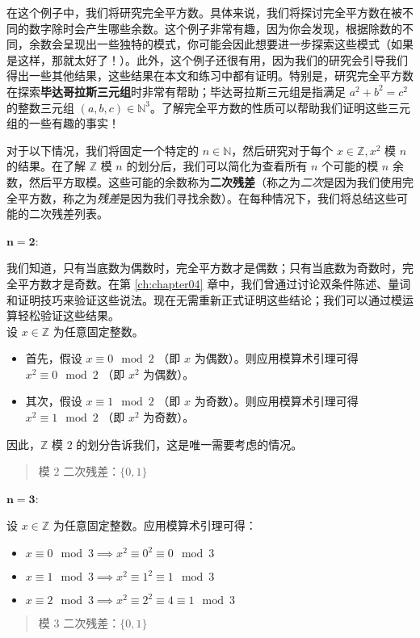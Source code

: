 \begin{example}[二次残差]\label{ex:example6.5.15}

    在这个例子中，我们将研究完全平方数。具体来说，我们将探讨完全平方数在被不同的数字除时会产生哪些余数。这个例子非常有趣，因为你会发现，根据除数的不同，余数会呈现出一些独特的模式，你可能会因此想要进一步探索这些模式（如果是这样，那就太好了！）。此外，这个例子还很有用，因为我们的研究会引导我们得出一些其他结果，这些结果在本文和练习中都有证明。特别是，研究完全平方数在探索\textbf{毕达哥拉斯三元组}时非常有帮助；毕达哥拉斯三元组是指满足 $a^2 + b^2 = c^2$ 的整数三元组 $(a, b, c) \in \mathbb{N}^3$。了解完全平方数的性质可以帮助我们证明这些三元组的一些有趣的事实！

    对于以下情况，我们将固定一个特定的 $n \in \mathbb{N}$，然后研究对于每个 $x \in \mathbb{Z}, x^2$ 模 $n$ 的结果。在了解 $\mathbb{Z}$ 模 $n$ 的划分后，我们可以简化为查看所有 $n$ 个可能的模 $n$ 余数，然后平方取模。这些可能的余数称为\textbf{二次残差}（称之为\emph{二次}是因为我们使用完全平方数，称之为\emph{残差}是因为我们寻找余数）。在每种情况下，我们将总结这些可能的二次残差列表。

    $\mathbf{n=2}$:

    我们知道，只有当底数为偶数时，完全平方数才是偶数；只有当底数为奇数时，完全平方数才是奇数。在第 \ref{ch:chapter04} 章中，我们曾通过讨论双条件陈述、量词和证明技巧来验证这些说法。现在无需重新正式证明这些结论；我们可以通过模运算轻松验证这些结果。\\
    设 $x \in \mathbb{Z}$ 为任意固定整数。
    \begin{itemize}
        \item 首先，假设 $x \equiv 0 \mod 2$ （即 $x$ 为偶数）。则应用模算术引理可得 $x^2 \equiv 0 \mod 2$ （即 $x^2$ 为偶数）。
        \item 其次，假设 $x \equiv 1 \mod 2$ （即 $x$ 为奇数）。则应用模算术引理可得 $x^2 \equiv 1 \mod 2$ （即 $x^2$ 为奇数）。
    \end{itemize}
    因此，$\mathbb{Z}$ 模 $2$ 的划分告诉我们，这是唯一需要考虑的情况。
    \begin{quotation}
        \begin{center}
            \large 模 $2$ 二次残差：$\{0, 1\}$
        \end{center}
    \end{quotation}

    $\mathbf{n=3}$: 

    设 $x \in \mathbb{Z}$ 为任意固定整数。应用模算术引理可得：
    \begin{itemize}
        \item $x \equiv 0 \mod 3 \implies x^2 \equiv 0^2 \equiv 0 \mod 3$
        \item $x \equiv 1 \mod 3 \implies x^2 \equiv 1^2 \equiv 1 \mod 3$
        \item $x \equiv 2 \mod 3 \implies x^2 \equiv 2^2 \equiv 4 \equiv 1 \mod 3$
    \end{itemize}
    \begin{quotation}
        \begin{center}
            \large 模 $3$ 二次残差：$\{0, 1\}$
        \end{center}
    \end{quotation}


\end{example}
